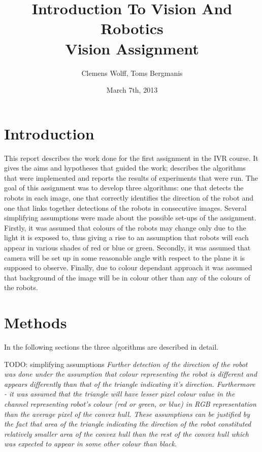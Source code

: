 \documentclass[10pt,a4paper]{article}
\title{Introduction To Vision And Robotics \\ Vision Assignment}
\author{Clemens Wolff, Toms Bergmanis}
\date{March 7th, 2013}
\begin{document}
\maketitle

\section{Introduction}\label{intro}
This report describes the work done for the first assignment in the IVR course. 
It gives the aims and hypotheses that guided the work; describes the algorithms 
that were implemented and reports the results of experiments that were run.
The goal of this assignment was to develop three algorithms: one that detects 
the robots in each image, one that correctly identifies the direction of the 
robot and one that links together detections of the robots in consecutive 
images. 
Several simplifying assumptions were made about the possible set-ups of the 
assignment.  Firstly, it was assumed that colours of the robots may change only 
due to the light it is exposed to, thus giving a rise to an assumption that 
robots will each appear in various shades of red or blue or green. Secondly, it 
was assumed that camera will be set up in some reasonable angle with respect to 
the plane it is supposed to observe. Finally, due to colour dependant approach 
it was assumed that background of the image will be in colour other than any of 
the colours of the robots.


\section{Methods}\label{methods}
In the following sections the three algorithms are described in detail. 

TODO: simplifying assumptions
\textit{
Further detection of the direction of the robot was done under the 
assumption that colour representing the robot is different and appears 
differently than that of the triangle indicating it's direction. 
Furthermore - it was assumed that the triangle will have lesser pixel 
colour value in the channel representing robot's colour (red or green, or 
blue) in RGB representation than the average pixel of the convex hull. 
These assumptions can be justified by the fact that area of the triangle 
indicating the direction of the robot constituted relatively smaller area 
of the convex hull than the rest of the convex hull which was expected to 
appear in some other colour than black.
} 
\end{document}
